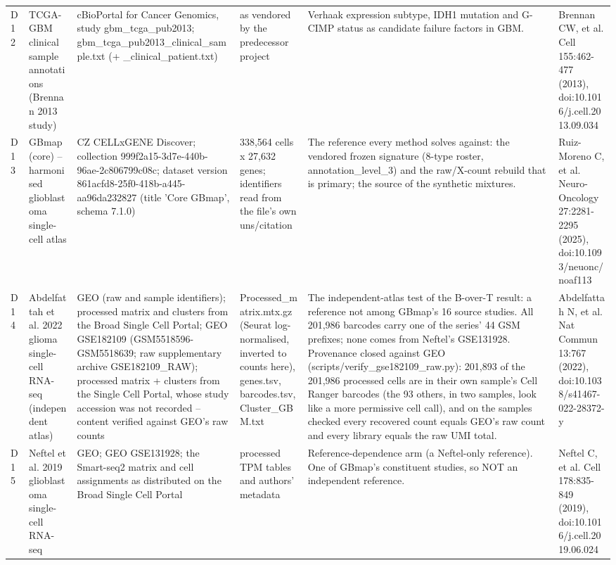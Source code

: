 \begin{table}[htbp]
\begin{tabular}{llllll}
D12 & TCGA-GBM clinical sample annotations (Brennan 2013 study) & cBioPortal for Cancer Genomics, study gbm\_tcga\_pub2013; gbm\_tcga\_pub2013\_clinical\_sample.txt (+ \_clinical\_patient.txt) & as vendored by the predecessor project & Verhaak expression subtype, IDH1 mutation and G-CIMP status as candidate failure factors in GBM. & Brennan CW, et al. Cell 155:462-477 (2013), doi:10.1016/j.cell.2013.09.034 \\
D13 & GBmap (core) -- harmonised glioblastoma single-cell atlas & CZ CELLxGENE Discover; collection 999f2a15-3d7e-440b-96ae-2c806799c08c; dataset version 861acfd8-25f0-418b-a445-aa96da232827 (title 'Core GBmap', schema 7.1.0) & 338,564 cells x 27,632 genes; identifiers read from the file's own uns/citation & The reference every method solves against: the vendored frozen signature (8-type roster, annotation\_level\_3) and the raw/X-count rebuild that is primary; the source of the synthetic mixtures. & Ruiz-Moreno C, et al. Neuro-Oncology 27:2281-2295 (2025), doi:10.1093/neuonc/noaf113 \\
D14 & Abdelfattah et al. 2022 glioma single-cell RNA-seq (independent atlas) & GEO (raw and sample identifiers); processed matrix and clusters from the Broad Single Cell Portal; GEO GSE182109 (GSM5518596-GSM5518639; raw supplementary archive GSE182109\_RAW); processed matrix + clusters from the Single Cell Portal, whose study accession was not recorded -- content verified against GEO's raw counts & Processed\_matrix.mtx.gz (Seurat log-normalised, inverted to counts here), genes.tsv, barcodes.tsv, Cluster\_GBM.txt & The independent-atlas test of the B-over-T result: a reference not among GBmap's 16 source studies. All 201,986 barcodes carry one of the series' 44 GSM prefixes; none comes from Neftel's GSE131928. Provenance closed against GEO (scripts/verify\_gse182109\_raw.py): 201,893 of the 201,986 processed cells are in their own sample's Cell Ranger barcodes (the 93 others, in two samples, look like a more permissive cell call), and on the samples checked every recovered count equals GEO's raw count and every library equals the raw UMI total. & Abdelfattah N, et al. Nat Commun 13:767 (2022), doi:10.1038/s41467-022-28372-y \\
D15 & Neftel et al. 2019 glioblastoma single-cell RNA-seq & GEO; GEO GSE131928; the Smart-seq2 matrix and cell assignments as distributed on the Broad Single Cell Portal & processed TPM tables and authors' metadata & Reference-dependence arm (a Neftel-only reference). One of GBmap's constituent studies, so NOT an independent reference. & Neftel C, et al. Cell 178:835-849 (2019), doi:10.1016/j.cell.2019.06.024 \\

\end{tabular}
\end{table}
